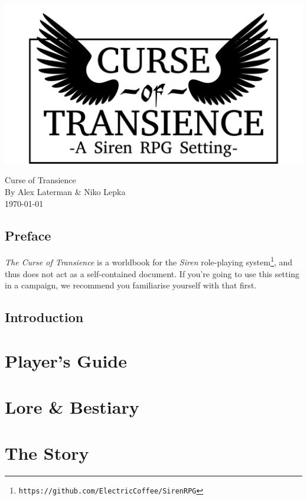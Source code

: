 \documentclass[a4paper]{book}
\begin{document}
\begin{titlepage}
    \begin{center}
        \includegraphics[width = \textwidth]{graphics/logo-winged.png}
    \end{center}
\end{titlepage}
\thispagestyle{empty}
\frontmatter
\begin{center}
    \Huge{Curse of Transience}\\
    \Large{By Alex Laterman \& Niko Lepka}\\
    \large{\today}
\end{center}

\chapter*{Preface}
\textit{The Curse of Transience} is a worldbook for the \textit{Siren} role-playing system\footnote{\texttt{https://github.com/ElectricCoffee/SirenRPG}}, and thus does not act as a self-contained document.
If you're going to use this setting in a campaign, we recommend you familiarise yourself with that first.

\chapter*{Introduction}

\tableofcontents
\mainmatter
\part{Player's Guide}










\part{Lore \& Bestiary}



\part{The Story}
\end{document}

